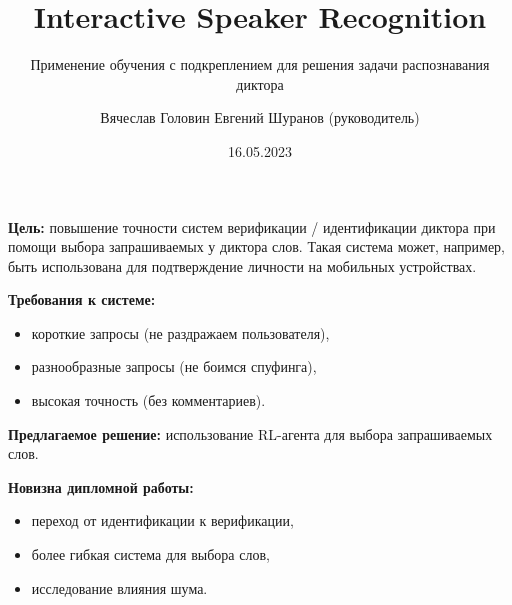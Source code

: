 \documentclass[aspectratio=169]{beamer}
\title{Interactive Speaker Recognition}
\subtitle{Применение обучения с подкреплением для решения задачи распознавания
          диктора}
\author[В.С.~Головин]{Вячеслав Головин \texorpdfstring{\newline}{, }
    {\small Евгений Шуранов (руководитель)}}
\institute[ВШЭ]{Huawei CBG AI и ФКН ВШЭ СПб}
\date{16.05.2023}
\begin{document}
\frame{\titlepage}

\begin{frame}{}
    \textbf{Цель:} повышение точности систем верификации / идентификации диктора
    при помощи выбора запрашиваемых у диктора слов. Такая система может, например,
    быть использована для подтверждение личности на мобильных
    устройствах.\vspace{1em}

    \textbf{Требования к системе:}
    \begin{itemize}
        \item короткие запросы (не раздражаем пользователя),
        \item разнообразные запросы (не боимся спуфинга),
        \item высокая точность (без комментариев).
    \end{itemize}\vspace{1em}

    \textbf{Предлагаемое решение:} использование RL-агента для выбора
    запрашиваемых слов.\vspace{1em}

    \textbf{Новизна дипломной работы:}
    \begin{itemize}
        \item переход от идентификации к верификации,
        \item более гибкая система для выбора слов,
        \item исследование влияния шума.
    \end{itemize}
\end{frame}
\end{document}
